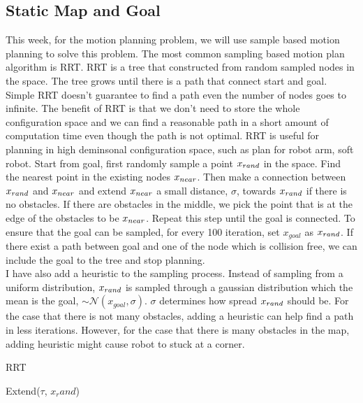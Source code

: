 \documentclass[letterpaper, 10 pt, conference]{ieeeconf}  %
\begin{document}
\subsection{Static Map and Goal}
This week, for the motion planning problem, we will use sample based motion planning to solve this problem. The most common 
sampling based motion plan algorithm is RRT. RRT is a tree that constructed from random sampled nodes in the space. The tree
grows until there is a path that connect start and goal. Simple RRT doesn't guarantee to find a path even the number
of nodes goes to infinite. The benefit of RRT is that we don't need to store the whole configuration space and we can find 
a reasonable path in a short amount of computation time even though the path is not optimal. RRT is useful for planning in 
high deminsonal configuration space, such as plan for robot arm, soft robot. 
Start from goal, first randomly sample a point $x_{rand}$ in the space. Find the nearest point in the existing nodes $x_{near}$.
Then make a connection between $x_{rand}$ and $x_{near}$ and extend $x_{near}$ a small distance, $\sigma$, towards $x_{rand}$ if there is no obstacles.
If there are obstacles in the middle, we pick the point that is at the edge of the obstacles to be $x_{near}$.
Repeat this step until the goal is connected. 
To ensure that the goal can be sampled, for every 100 iteration, set $x_{goal}$ as $x_{rand}$. If there exist a path between goal and 
one of the node which is collision free, we can include the goal to the tree and stop planning. \\

I have also add a heuristic to the sampling process. Instead of sampling from a uniform distribution, $x_{rand}$ is sampled through 
a gaussian distribution which the mean is the goal, $\sim \mathcal{N}(x_{goal}, \sigma)$. $\sigma$ determines how spread 
$x_{rand}$ should be. For the case that there is not many obstacles, adding a heuristic can help find a path in less iterations. However, 
for the case that there is many obstacles in the map, adding heuristic might cause robot to stuck at a corner. 

\begin{algorithm}[H]
\caption{RRT}\label{alg:RRT1}
\begin{algorithmic}[1]
\EndFor
\end{algorithmic}
\end{algorithm}

\begin{algorithm}[H]
\caption{Extend($\tau$, $x_rand$)}\label{alg:RRTe}
\begin{algorithmic}[1]
\EndIf
\EndIf
\end{algorithmic}
\end{algorithm}
\end{document}
